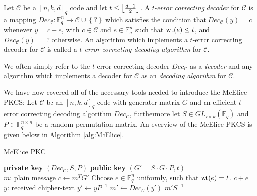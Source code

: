 \begin{definition}\label{def:decoder}
Let $\mathcal{C}$ be a $[n, k, d]_{q}$ code and let $t \leq \left\lfloor\frac{d - 1}{2}\right\rfloor$. A \textit{$t$-error correcting decoder} for $\mathcal{C}$ is a mapping $Dec_{\mathcal{C}}: \mathbb{F}_q^n \to \mathcal{C} \cup \left\{?\right\}$ which satisfies the condition that $Dec_{\mathcal{C}}(y) = c$ whenever $y = c + e$, with $c \in \mathcal{C}$ and $e \in \mathbb{F}_q^n$ such that $\mathrm{wt}(e) \leq t$, and $Dec_{\mathcal{C}}(y) = \; ?$ otherwise. An algorithm which implements a $t$-error correcting decoder for $\mathcal{C}$ is called a \textit{$t$-error correcting decoding algorithm} for $\mathcal{C}$.
\end{definition}
\begin{remark}
  We often simply refer to the $t$-error correcting decoder $Dec_{\mathcal{C}}$ as a \textit{decoder} and any algorithm which implements a decoder for $\mathcal{C}$ as an \textit{decoding algorithm} for $\mathcal{C}$.
\end{remark}


We have now covered all of the necessary tools needed to introduce the McElice PKCS:
Let $\mathcal{C}$ be an $[n, k, d]_q$ code with generator matrix $G$ and an efficient $t$-error correcting decoding algorithm $Dec_{\mathcal{C}}$, furthermore let $S \in GL_{k \times k}(\mathbb{F}_q)$ and $P \in \mathbb{F}_q^{n \times n}$ be a random permutation matrix. An overview of the McElice PKCS is given below in Algorithm \ref{alg:McElice}.
\begin{algorithm}
\caption{McElice PKC}\label{alg:McElice}
\begin{algorithmic}
  \State \textbf{private key} $(Dec_{\mathcal{C}}, S, P)$
  \State \textbf{public key} $(G' = S \cdot G \cdot P, t)$
  \\
   {$m$: plain message}
    \State $c \gets m^{T} G'$
    \State Choose $e \in \mathbb{F}_q^n$ uniformly, such that $\mathrm{wt}(e) = t$.
    \State \Return $c + e$
  \EndProcedure \\
   {$y$: received chipher-text}
    \State $y' \gets y P^{-1}$
    \State $m' \gets Dec_{\mathcal{C}}(y')$
    \State \Return $m' S^{-1}$
  \EndProcedure
\end{algorithmic}
\end{algorithm}

